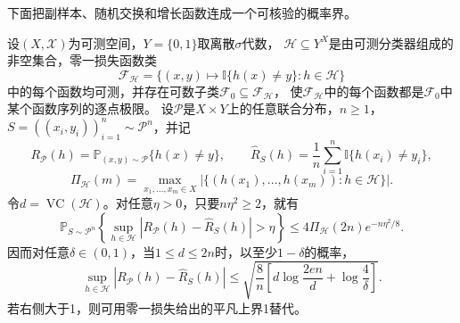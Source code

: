 下面把副样本、随机交换和增长函数连成一个可核验的概率界。

\begin{theorem}[VC一致收敛界]
\label{thm:vc-uniform-convergence}
设$(X,\mathcal X)$为可测空间，$Y=\{0,1\}$取离散$\sigma$代数，
$\mathcal H\subseteq Y^X$是由可测分类器组成的非空集合，零一损失函数类
\[
 \mathcal F_{\mathcal H}
 =\{(x,y)\mapsto\mathbb I\{h(x)\neq y\}:h\in\mathcal H\}
\]
中的每个函数均可测，并存在可数子类$\mathcal F_0\subseteq\mathcal F_{\mathcal H}$，
使$\mathcal F_{\mathcal H}$中的每个函数都是$\mathcal F_0$中某个函数序列的逐点极限。
设$\mathcal P$是$X\times Y$上的任意联合分布，$n\geq1$，
$S=((x_i,y_i))_{i=1}^n\sim\mathcal P^n$，并记
\[
 R_{\mathcal P}(h)=\mathbb P_{(x,y)\sim\mathcal P}\{h(x)\neq y\},\qquad
 \hat R_S(h)=\frac1n\sum_{i=1}^n\mathbb I\{h(x_i)\neq y_i\},
\]
\[
 \Pi_{\mathcal H}(m)
 =\max_{x_1,\ldots,x_m\in X}
 \left|\{(h(x_1),\ldots,h(x_m)):h\in\mathcal H\}\right|.
\]
令$d=\operatorname{VC}(\mathcal H)$。对任意$\eta>0$，只要$n\eta^2\geq2$，就有
\begin{equation}
 \mathbb P_{S\sim\mathcal P^n}\left\{
   \sup_{h\in\mathcal H}|R_{\mathcal P}(h)-\hat R_S(h)|>\eta
 \right\}
 \leq4\Pi_{\mathcal H}(2n)e^{-n\eta^2/8}.
 \label{eq:vc-symmetrization-probability}
\end{equation}
因而对任意$\delta\in(0,1)$，当$1\leq d\leq2n$时，以至少$1-\delta$的概率，
\begin{equation}
 \sup_{h\in\mathcal H}|R_{\mathcal P}(h)-\hat R_S(h)|
 \leq
 \sqrt{\frac8n\left[
   d\log\frac{2en}{d}+\log\frac4\delta
 \right]}.
 \label{eq:vc-uniform-bound}
\end{equation}
若右侧大于1，则可用零一损失给出的平凡上界1替代。
\end{theorem}

